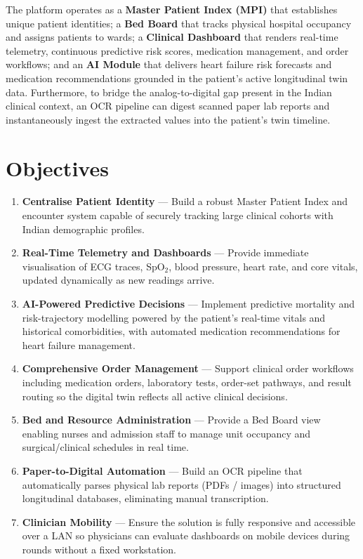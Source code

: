 \documentclass[12pt,a4paper]{article}
\begin{document}
The platform operates as a \textbf{Master Patient Index (MPI)} that establishes unique
patient identities; a \textbf{Bed Board} that tracks physical hospital occupancy and
assigns patients to wards; a \textbf{Clinical Dashboard} that renders real-time
telemetry, continuous predictive risk scores, medication management, and order workflows;
and an \textbf{AI Module} that delivers heart failure risk forecasts and medication
recommendations grounded in the patient's active longitudinal twin data.  Furthermore,
to bridge the analog-to-digital gap present in the Indian clinical context, an OCR
pipeline can digest scanned paper lab reports and instantaneously ingest the extracted
values into the patient's twin timeline.

\section{Objectives}

\begin{enumerate}[label=\textbf{\arabic*.}, leftmargin=*, itemsep=4pt]
  \item \textbf{Centralise Patient Identity} — Build a robust Master Patient Index
        and encounter system capable of securely tracking large clinical cohorts with
        Indian demographic profiles.
  \item \textbf{Real-Time Telemetry and Dashboards} — Provide immediate visualisation
        of ECG traces, SpO$_2$, blood pressure, heart rate, and core vitals, updated
        dynamically as new readings arrive.
  \item \textbf{AI-Powered Predictive Decisions} — Implement predictive mortality and
        risk-trajectory modelling powered by the patient's real-time vitals and
        historical comorbidities, with automated medication recommendations for heart
        failure management.
  \item \textbf{Comprehensive Order Management} — Support clinical order workflows
        including medication orders, laboratory tests, order-set pathways, and result
        routing so the digital twin reflects all active clinical decisions.
  \item \textbf{Bed and Resource Administration} — Provide a Bed Board view enabling
        nurses and admission staff to manage unit occupancy and surgical/clinical
        schedules in real time.
  \item \textbf{Paper-to-Digital Automation} — Build an OCR pipeline that automatically
        parses physical lab reports (PDFs / images) into structured longitudinal databases,
        eliminating manual transcription.
  \item \textbf{Clinician Mobility} — Ensure the solution is fully responsive and
        accessible over a LAN so physicians can evaluate dashboards on mobile devices
        during rounds without a fixed workstation.
\end{enumerate}
\end{document}
